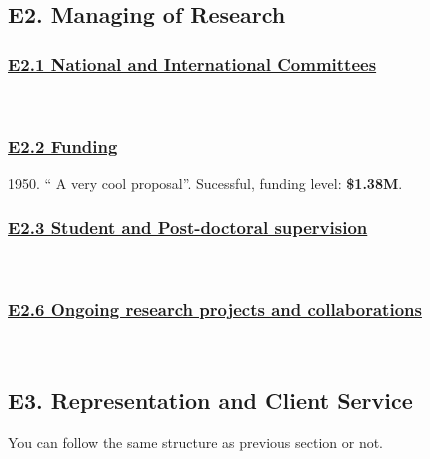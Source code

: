 \documentclass[11pt,letterpaper,roman]{article}
\newcounter{qcounter}
\begin{document}
\subsection*{E2. Managing of Research}

\subsubsection*{\underline{E2.1 National and International Committees}}
\begin{list}{E2.1a-:~}{}
 \item ~
\end{list}


\subsubsection*{\underline{E2.2 Funding}}
\begin{list}{E2.2-:~}{}
\item \label{funding1} 1950. `` A very cool proposal''. Sucessful, funding level: {\bf \$1.38M}. 
\end{list}



\subsubsection*{\underline{E2.3 Student and Post-doctoral supervision}}
\begin{list}{E2.3-:~}{}
\item ~
\end{list}


\subsubsection*{\underline{E2.6 Ongoing research projects and collaborations}}
\begin{list}{E2.6-:~}{}
\item ~
\end{list}


\subsection*{E3. Representation and Client Service}

You can follow the same structure as previous section or not.
\end{document}

